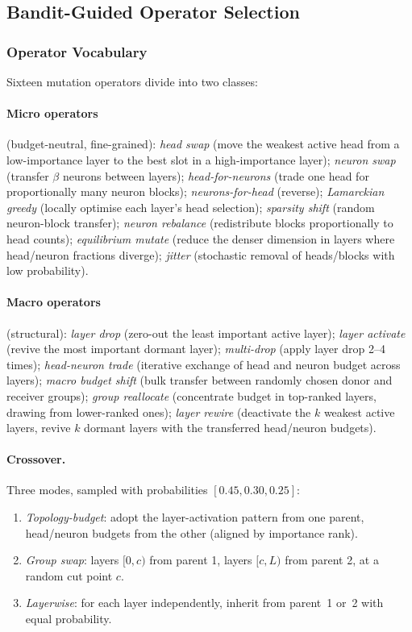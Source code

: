 \documentclass{article}
\begin{document}
\subsection{Bandit-Guided Operator Selection}
\label{sec:bandit}

\subsubsection{Operator Vocabulary}

Sixteen mutation operators divide into two classes:

\paragraph{Micro operators} (budget-neutral, fine-grained):
\emph{head swap} (move the weakest active head from a low-importance
layer to the best slot in a high-importance layer);
\emph{neuron swap} (transfer $\beta$ neurons between layers);
\emph{head-for-neurons} (trade one head for proportionally many neuron
blocks);
\emph{neurons-for-head} (reverse);
\emph{Lamarckian greedy} (locally optimise each layer's head
selection);
\emph{sparsity shift} (random neuron-block transfer);
\emph{neuron rebalance} (redistribute blocks proportionally to head
counts);
\emph{equilibrium mutate} (reduce the denser dimension in layers where
head/neuron fractions diverge);
\emph{jitter} (stochastic removal of heads/blocks with low probability).

\paragraph{Macro operators} (structural):
\emph{layer drop} (zero-out the least important active layer);
\emph{layer activate} (revive the most important dormant layer);
\emph{multi-drop} (apply layer drop 2--4 times);
\emph{head-neuron trade} (iterative exchange of head and neuron budget
across layers);
\emph{macro budget shift} (bulk transfer between randomly chosen donor
and receiver groups);
\emph{group reallocate} (concentrate budget in top-ranked layers,
drawing from lower-ranked ones);
\emph{layer rewire} (deactivate the $k$ weakest active layers, revive
$k$ dormant layers with the transferred head/neuron budgets).

\paragraph{Crossover.}
Three modes, sampled with probabilities $[0.45, 0.30, 0.25]$:
\begin{enumerate}[leftmargin=*,label=(\roman*)]
  \item \emph{Topology-budget}: adopt the layer-activation pattern from
    one parent, head/neuron budgets from the other (aligned by
    importance rank).
  \item \emph{Group swap}: layers $[0,c)$ from parent 1, layers
    $[c,L)$ from parent 2, at a random cut point $c$.
  \item \emph{Layerwise}: for each layer independently, inherit from
    parent~1 or~2 with equal probability.
\end{enumerate}
\end{document}
